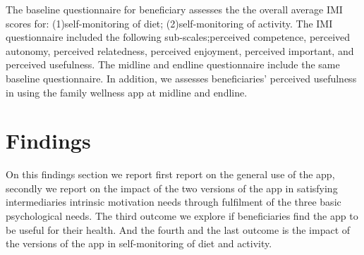 \documentclass{sig-alternate}
\begin{document}
The baseline questionnaire for beneficiary assesses the the overall average IMI scores for: (1)self-monitoring of diet; (2)self-monitoring of activity. The IMI questionnaire included the following sub-scales;perceived competence, perceived autonomy, perceived relatedness, perceived enjoyment, perceived important, and perceived usefulness. The midline and endline questionnaire include the same baseline questionnaire. In addition, we assesses beneficiaries' perceived usefulness in using the family wellness app at midline and endline.
\section{Findings}
On this findings section we report first report on the general use of the app, secondly we report on the impact of the two versions of the app in satisfying intermediaries intrinsic motivation needs through fulfilment of the three basic psychological needs. The third outcome we explore if beneficiaries find the app to be useful for their health. And the fourth and the last outcome is the impact of the versions of the app in self-monitoring of diet and activity.\newline
\end{document}
